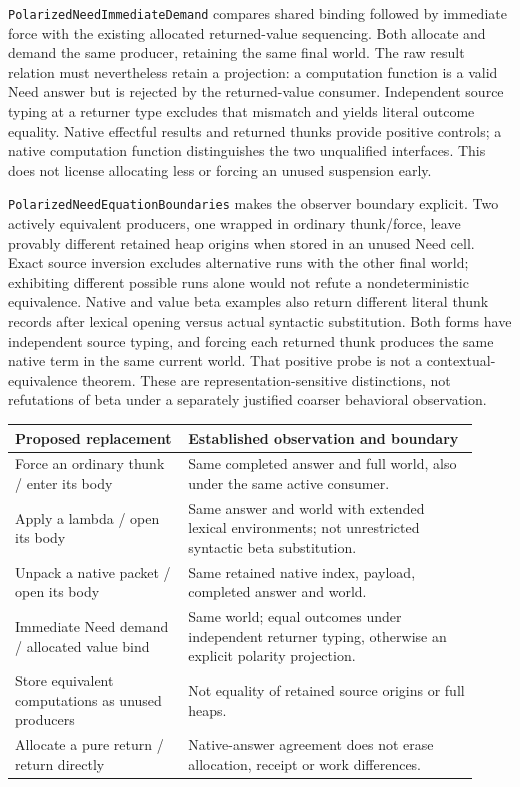 \documentclass[11pt]{article}
\theoremstyle{definition}
\theoremstyle{remark}
\begin{document}
\nolinkurl{PolarizedNeedImmediateDemand} compares shared binding followed
by immediate force with the existing allocated returned-value sequencing.
Both allocate and demand the same producer, retaining the same final world.
The raw result relation must nevertheless retain a projection: a computation
function is a valid Need answer but is rejected by the returned-value
consumer. Independent source typing at a returner type excludes that mismatch
and yields literal outcome equality. Native effectful results and returned
thunks provide positive controls; a native computation function distinguishes
the two unqualified interfaces. This does not license allocating less or
forcing an unused suspension early.

\nolinkurl{PolarizedNeedEquationBoundaries} makes the observer boundary
explicit. Two actively equivalent producers, one wrapped in ordinary
thunk/force, leave provably different retained heap origins when stored in
an unused Need cell. Exact source inversion excludes alternative runs with
the other final world; exhibiting different possible runs alone would not
refute a nondeterministic equivalence. Native and value beta examples also
return different literal thunk records after lexical opening versus actual
syntactic substitution. Both forms have independent source typing, and
forcing each returned thunk produces the same native term in the same
current world. That positive probe is not a contextual-equivalence theorem.
These are representation-sensitive distinctions, not refutations of beta
under a separately justified coarser behavioral observation.

\begin{center}
\begin{tabular}{p{0.34\linewidth}p{0.58\linewidth}}
\toprule
Proposed replacement & Established observation and boundary \\
\midrule
Force an ordinary thunk / enter its body & Same completed answer and full
  world, also under the same active consumer. \\
Apply a lambda / open its body & Same answer and world with extended lexical
  environments; not unrestricted syntactic beta substitution. \\
Unpack a native packet / open its body & Same retained native index, payload,
  completed answer and world. \\
Immediate Need demand / allocated value bind & Same world; equal outcomes
  under independent returner typing, otherwise an explicit polarity projection. \\
Store equivalent computations as unused producers & Not equality of retained
  source origins or full heaps. \\
Allocate a pure return / return directly & Native-answer agreement does not
  erase allocation, receipt or work differences. \\
\bottomrule
\end{tabular}
\end{center}
\end{document}
